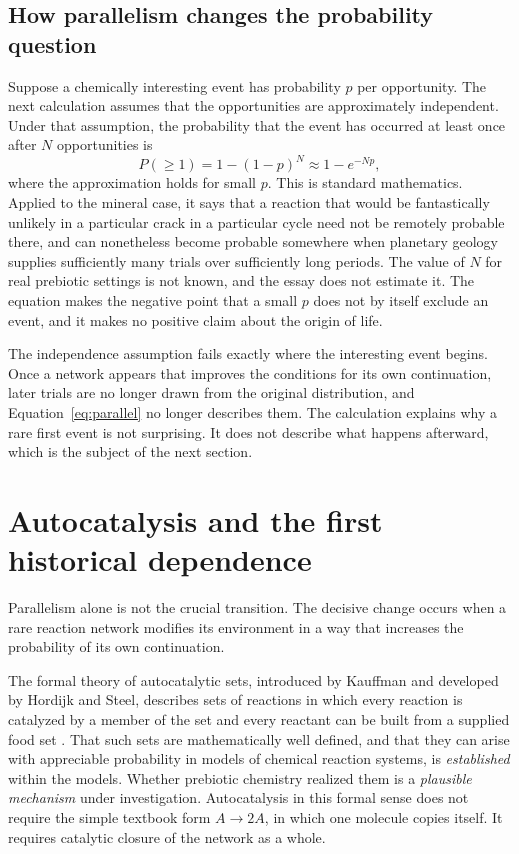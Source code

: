 \documentclass[11pt]{article}
\begin{document}
\subsection{How parallelism changes the probability question}

Suppose a chemically interesting event has probability $p$ per opportunity. The next calculation assumes that the opportunities are approximately independent. Under that assumption, the probability that the event has occurred at least once after $N$ opportunities is
\begin{equation}\label{eq:parallel}
P(\geq 1) = 1-(1-p)^N \approx 1-e^{-Np},
\end{equation}
where the approximation holds for small $p$. This is standard mathematics. Applied to the mineral case, it says that a reaction that would be fantastically unlikely in a particular crack in a particular cycle need not be remotely probable there, and can nonetheless become probable somewhere when planetary geology supplies sufficiently many trials over sufficiently long periods. The value of $N$ for real prebiotic settings is not known, and the essay does not estimate it. The equation makes the negative point that a small $p$ does not by itself exclude an event, and it makes no positive claim about the origin of life.

The independence assumption fails exactly where the interesting event begins. Once a network appears that improves the conditions for its own continuation, later trials are no longer drawn from the original distribution, and Equation~\eqref{eq:parallel} no longer describes them. The calculation explains why a rare first event is not surprising. It does not describe what happens afterward, which is the subject of the next section.

\section{Autocatalysis and the first historical dependence}

Parallelism alone is not the crucial transition. The decisive change occurs when a rare reaction network modifies its environment in a way that increases the probability of its own continuation.

The formal theory of autocatalytic sets, introduced by Kauffman and developed by Hordijk and Steel, describes sets of reactions in which every reaction is catalyzed by a member of the set and every reactant can be built from a supplied food set \cite{kauffman,hordijk2004,hordijk2019}. That such sets are mathematically well defined, and that they can arise with appreciable probability in models of chemical reaction systems, is \emph{established} within the models. Whether prebiotic chemistry realized them is a \emph{plausible mechanism} under investigation. Autocatalysis in this formal sense does not require the simple textbook form $A \rightarrow 2A$, in which one molecule copies itself. It requires catalytic closure of the network as a whole.
\end{document}

